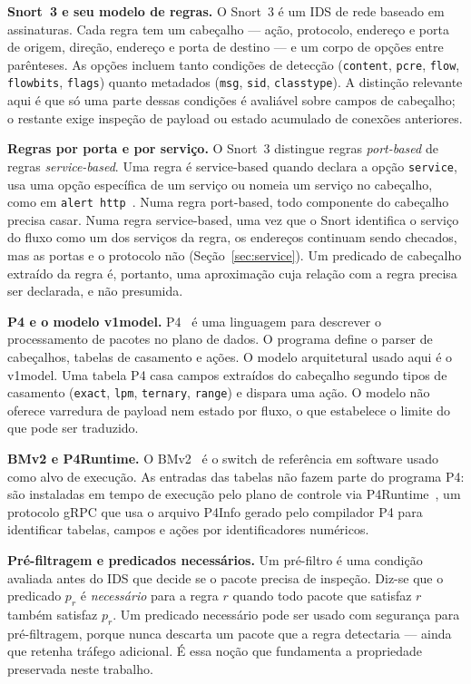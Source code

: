 \documentclass[conference]{IEEEtran}
\begin{document}
\textbf{Snort~3 e seu modelo de regras.} O Snort~3 é um IDS de rede baseado em
assinaturas. Cada regra tem um cabeçalho --- ação, protocolo, endereço e porta
de origem, direção, endereço e porta de destino --- e um corpo de opções entre
parênteses. As opções incluem tanto condições de detecção (\texttt{content},
\texttt{pcre}, \texttt{flow}, \texttt{flowbits}, \texttt{flags}) quanto
metadados (\texttt{msg}, \texttt{sid}, \texttt{classtype}). A distinção
relevante aqui é que só uma parte dessas condições é avaliável sobre campos de
cabeçalho; o restante exige inspeção de payload ou estado acumulado de
conexões anteriores.

\textbf{Regras por porta e por serviço.} O Snort~3 distingue regras
\emph{port-based} de regras \emph{service-based}. Uma regra é service-based
quando declara a opção \texttt{service}, usa uma opção específica de um
serviço ou nomeia um serviço no cabeçalho, como em
\texttt{alert http}~\cite{snort3manual}. Numa regra port-based, todo
componente do cabeçalho precisa casar. Numa regra service-based, uma vez que o
Snort identifica o serviço do fluxo como um dos serviços da regra, os
endereços continuam sendo checados, mas as portas e o protocolo não
(Seção~\ref{sec:service}). Um predicado de cabeçalho extraído da regra é,
portanto, uma aproximação cuja relação com a regra precisa ser declarada, e
não presumida.

\textbf{P4 e o modelo v1model.} P4~\cite{p4spec2023} é uma linguagem para
descrever o processamento de pacotes no plano de dados. O programa define o
parser de cabeçalhos, tabelas de casamento e ações. O modelo arquitetural
usado aqui é o v1model. Uma tabela P4 casa campos extraídos do cabeçalho
segundo tipos de casamento (\texttt{exact}, \texttt{lpm}, \texttt{ternary},
\texttt{range}) e dispara uma ação. O modelo não oferece varredura de payload
nem estado por fluxo, o que estabelece o limite do que pode ser traduzido.

\textbf{BMv2 e P4Runtime.} O BMv2~\cite{bmv2} é o switch de referência em
software usado como alvo de execução. As entradas das tabelas não fazem parte
do programa P4: são instaladas em tempo de execução pelo plano de controle via
P4Runtime~\cite{p4runtime2024}, um protocolo gRPC que usa o arquivo P4Info
gerado pelo compilador P4 para identificar tabelas, campos e ações por
identificadores numéricos.

\textbf{Pré-filtragem e predicados necessários.} Um pré-filtro é uma condição
avaliada antes do IDS que decide se o pacote precisa de inspeção. Diz-se que o
predicado $p_r$ é \emph{necessário} para a regra $r$ quando todo pacote que
satisfaz $r$ também satisfaz $p_r$. Um predicado necessário pode ser usado com
segurança para pré-filtragem, porque nunca descarta um pacote que a regra
detectaria --- ainda que retenha tráfego adicional. É essa noção que
fundamenta a propriedade preservada neste trabalho.
\end{document}
